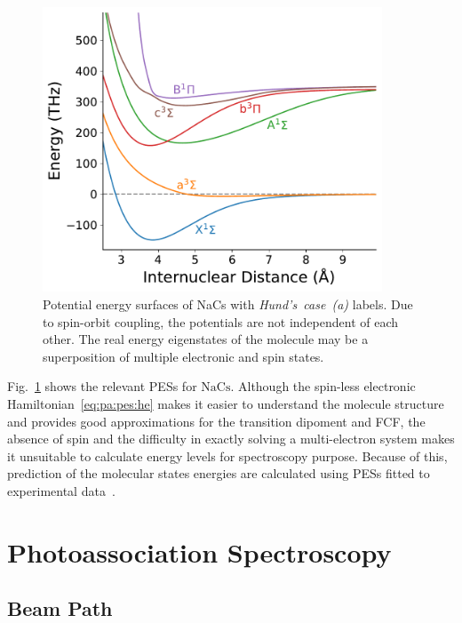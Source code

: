 \begin{figure}
  \centering
  \includegraphics[width=0.9\textwidth]{figures/pa_pes.pdf}
  \caption[NaCs potential energy surfaces]{
    Potential energy surfaces of NaCs with \textit{Hund's~case~(a)} labels.
    Due to spin-orbit coupling, the potentials are not independent of each other.
    The real energy eigenstates of the molecule may be a superposition of multiple
    electronic and spin states.
    \label{fig:pa:pes}}
\end{figure}

Fig.~\ref{fig:pa:pes} shows the relevant PESs for $\mathrm{NaCs}$.
Although the spin-less electronic Hamiltonian~\ref{eq:pa:pes:he} makes it easier
to understand the molecule structure and provides good approximations for the
transition dipoment and FCF, the absence of spin and the difficulty in exactly solving
a multi-electron system makes it unsuitable to calculate energy levels
for spectroscopy purpose.
Because of this, prediction of the molecular states energies are calculated using
PESs fitted to experimental data~\cite{docenko_coupling_2006,zaharova_solution_2009,grochola_spin-forbidden_2011,grochola_investigation_2010}.

\section{Photoassociation Spectroscopy}
\label{ch:pa:pa}

\subsection{Beam Path}
\label{ch:pa:beampath}

